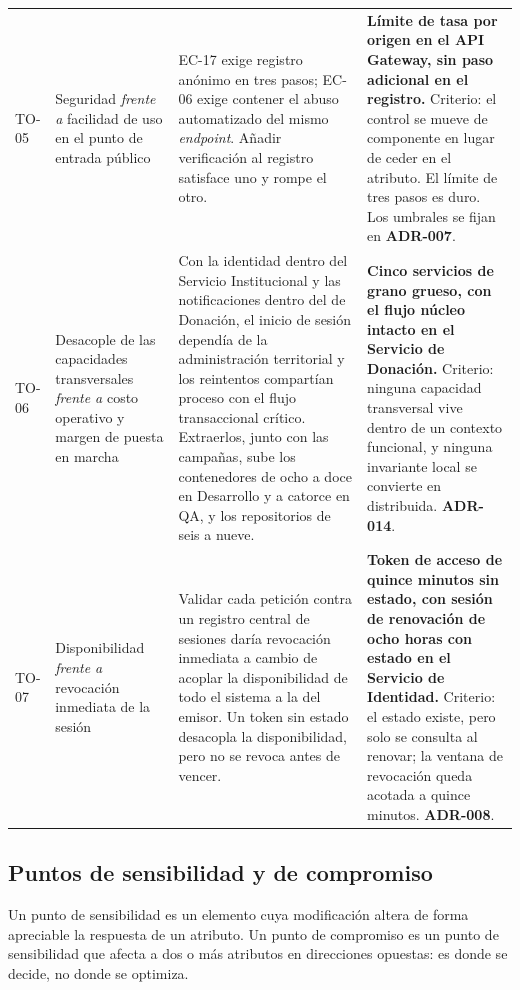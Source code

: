 \documentclass[11pt,a4paper]{article}
\begin{document}
\begin{longtable}{L{1.2cm} L{3.4cm} L{4.6cm} L{4.7cm}}
TO-05 & Seguridad \emph{frente a} facilidad de uso en el punto de entrada público & EC-17 exige registro anónimo en tres pasos; EC-06 exige contener el abuso automatizado del mismo \emph{endpoint}. Añadir verificación al registro satisface uno y rompe el otro. & \textbf{Límite de tasa por origen en el API Gateway, sin paso adicional en el registro.} Criterio: el control se mueve de componente en lugar de ceder en el atributo. El límite de tres pasos es duro. Los umbrales se fijan en \textbf{ADR-007}. \\
TO-06 & Desacople de las capacidades transversales \emph{frente a} costo operativo y margen de puesta en marcha & Con la identidad dentro del Servicio Institucional y las notificaciones dentro del de Donación, el inicio de sesión dependía de la administración territorial y los reintentos compartían proceso con el flujo transaccional crítico. Extraerlos, junto con las campañas, sube los contenedores de ocho a doce en Desarrollo y a catorce en QA, y los repositorios de seis a nueve. & \textbf{Cinco servicios de grano grueso, con el flujo núcleo intacto en el Servicio de Donación.} Criterio: ninguna capacidad transversal vive dentro de un contexto funcional, y ninguna invariante local se convierte en distribuida. \textbf{ADR-014}. \\
TO-07 & Disponibilidad \emph{frente a} revocación inmediata de la sesión & Validar cada petición contra un registro central de sesiones daría revocación inmediata a cambio de acoplar la disponibilidad de todo el sistema a la del emisor. Un token sin estado desacopla la disponibilidad, pero no se revoca antes de vencer. & \textbf{Token de acceso de quince minutos sin estado, con sesión de renovación de ocho horas con estado en el Servicio de Identidad.} Criterio: el estado existe, pero solo se consulta al renovar; la ventana de revocación queda acotada a quince minutos. \textbf{ADR-008}. \\
\end{longtable}

\subsection{Puntos de sensibilidad y de compromiso}

Un punto de sensibilidad es un elemento cuya modificación altera de forma apreciable la respuesta de un atributo. Un punto de compromiso es un punto de sensibilidad que afecta a dos o más atributos en direcciones opuestas: es donde se decide, no donde se optimiza.
\end{document}
